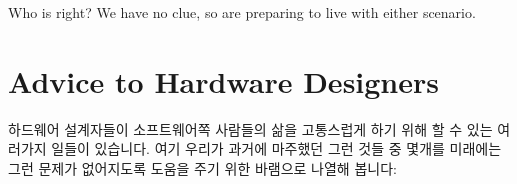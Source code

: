 Who is right?
We have no clue, so are preparing to live with either scenario.
\fi

\section{Advice to Hardware Designers}
\label{sec:app:whymb:Advice to Hardware Designers}

하드웨어 설계자들이 소프트웨어쪽 사람들의 삶을 고통스럽게 하기 위해 할 수 있는
여러가지 일들이 있습니다.
여기 우리가 과거에 마주했던 그런 것들 중 몇개를 미래에는 그런 문제가 없어지도록
도움을 주기 위한 바램으로 나열해 봅니다:
\iffalse

There are any number of things that hardware designers can do
to make the lives of software people difficult.
Here is a list of a few such things that we have encountered in
the past, presented here in the hope that it might help prevent
future such problems:
\fi
